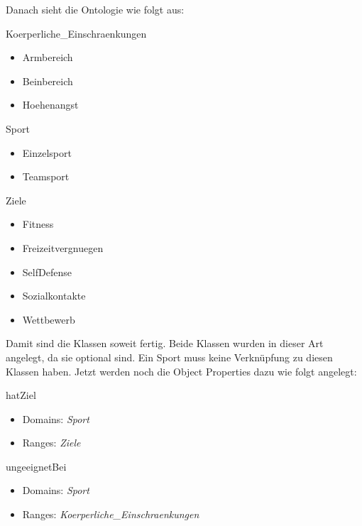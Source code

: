 Danach sieht die Ontologie wie folgt aus:
\begin{capitemize}
	\item Koerperliche\_Einschraenkungen
		\begin{itemize}
				\item Armbereich
				\item Beinbereich
				\item Hoehenangst
		\end{itemize}
	\item Sport
		\begin{itemize}
			\item Einzelsport
			\item Teamsport
		\end{itemize}
	\item Ziele
		\begin{itemize}
				\item Fitness
				\item Freizeitvergnuegen
				\item SelfDefense
				\item Sozialkontakte
				\item Wettbewerb
		\end{itemize}
\end{capitemize}

Damit sind die Klassen soweit fertig. Beide Klassen wurden in dieser Art angelegt, da sie optional sind. Ein Sport muss keine Verknüpfung zu diesen Klassen haben.  Jetzt werden noch die Object Properties dazu wie folgt angelegt: 

\begin{capitemize}
	\item hatZiel
		\begin{itemize}
			\item Domains: \textit{Sport}
			\item Ranges: \textit{Ziele}
		\end{itemize}
	\item ungeeignetBei
		\begin{itemize}
			\item Domains: \textit{Sport}
			\item Ranges: \textit{Koerperliche\_Einschraenkungen}
		\end{itemize}
\end{capitemize}

